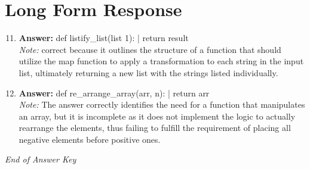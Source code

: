 \documentclass[12pt]{article}
\begin{document}
\section*{Long Form Response}
\begin{enumerate}[label=\arabic*.]
\setcounter{enumi}{10}
\item \textbf{Answer:} def listify\_list(list 1): | return result
\\ \textit{Note:} correct because it outlines the structure of a function that should utilize the map function to apply a transformation to each string in the input list, ultimately returning a new list with the strings listed individually.
\item \textbf{Answer:} def re\_arrange\_array(arr, n): | return arr
\\ \textit{Note:} The answer correctly identifies the need for a function that manipulates an array, but it is incomplete as it does not implement the logic to actually rearrange the elements, thus failing to fulfill the requirement of placing all negative elements before positive ones.
\end{enumerate}

\vfill
\noindent\textit{End of Answer Key}
\end{document}
